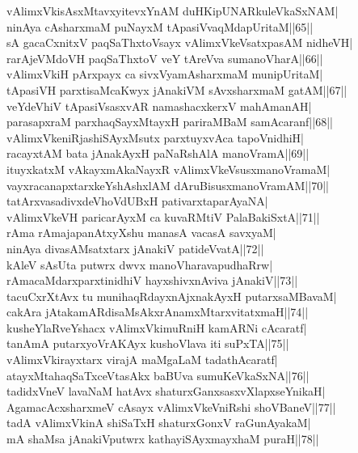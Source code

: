 \documentclass{article}
\begin{document}
vAlimxVkisAsxMtavxyitevxYnAM duHKipUNARkuleVkaSxNAM|\\
ninAya cAsharxmaM puNayxM tApasiVvaqMdapUritaM||65||\\
sA gacaCxnitxV paqSaThxtoVsayx vAlimxVkeVsatxpasAM nidheVH|\\
rarAjeVMdoVH paqSaThxtoV veY tAreVva sumanoVharA||66||\\
vAlimxVkiH pArxpayx ca sivxVyamAsharxmaM munipUritaM|\\
tApasiVH parxtisaMcaKwyx jAnakiVM sAvxsharxmaM gatAM||67||\\
veYdeVhiV tApasiVsasxvAR namashacxkerxV mahAmanAH|\\
parasapxraM parxhaqSayxMtayxH pariraMBaM samAcaranf||68||\\
vAlimxVkeniRjashiSAyxMsutx parxtuyxvAca tapoVnidhiH|\\
racayxtAM bata jAnakAyxH paNaRshAlA manoVramA||69||\\
ituyxkatxM vAkayxmAkaNayxR vAlimxVkeVsusxmanoVramaM|\\
vayxracanapxtarxkeYshAshxlAM dAruBisusxmanoVramAM||70||\\
tatArxvasadivxdeVhoVdUBxH pativarxtaparAyaNA|\\
vAlimxVkeVH paricarAyxM ca kuvaRMtiV PalaBakiSxtA||71||\\
rAma rAmajapanAtxyXshu manasA vacasA savxyaM|\\
ninAya divasAMsatxtarx jAnakiV patideVvatA||72||\\
kAleV sAsUta putwrx dwvx manoVharavapudhaRrw|\\
rAmacaMdarxparxtinidhiV hayxshivxnAviva jAnakiV||73||\\
tacuCxrXtAvx tu munihaqRdayxnAjxnakAyxH putarxsaMBavaM|\\
cakAra jAtakamARdisaMsAkxrAnamxMtarxvitatxmaH||74||\\
kusheYlaRveYshacx vAlimxVkimuRniH kamARNi cAcaratf|\\
tanAmA putarxyoVrAKAyx kushoVlava iti suPxTA||75||\\
vAlimxVkirayxtarx virajA maMgaLaM tadathAcaratf|\\
atayxMtahaqSaTxceVtasAkx baBUva sumuKeVkaSxNA||76||\\
tadidxVneV lavaNaM hatAvx shaturxGanxsasxvXlapxseYnikaH|\\
AgamacAcxsharxmeV cAsayx vAlimxVkeVniRshi shoVBaneV||77||\\
tadA vAlimxVkinA shiSaTxH shaturxGonxV raGunAyakaM|\\
mA shaMsa jAnakiVputwrx kathayiSAyxmayxhaM puraH||78||\\
\end{document}
